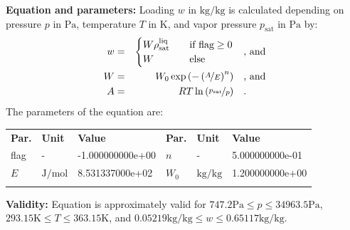 \textbf{Equation and parameters:}
\newline
%
Loading $w$ in $\si{\kilogram\per\kilogram}$ is calculated depending on pressure $p$ in $\si{\pascal}$, temperature $T$ in $\si{\kelvin}$, and vapor pressure $p_\mathrm{sat}$ in $\si{\pascal}$ by:
%
\begin{equation*}
\begin{split}
w &=& \begin{cases} W \rho_\mathrm{sat}^{\mathrm{liq}} & \quad \text{if flag} \geq 0 \\ W & \quad \text{else} \end{cases} & \quad\text{, and} \\
W &=& W_0 \exp \left( - \left( \nicefrac{A}{E} \right) ^{n} \right) & \quad\text{, and} \\
A &=& R T \ln \left( \nicefrac{p_\mathrm{sat}}{p} \right) & \quad\text{.} \\
\end{split}
\end{equation*}
%
The parameters of the equation are:
%
\begin{longtable}[l]{lll|lll}
\toprule
\addlinespace
\textbf{Par.} & \textbf{Unit} & \textbf{Value} &	\textbf{Par.} & \textbf{Unit} & \textbf{Value} \\
\addlinespace
\midrule
\endhead

\bottomrule
\endfoot
\bottomrule
\endlastfoot
\addlinespace

flag & - & -1.000000000e+00 & $n$ & - & 5.000000000e-01 \\
$E$ & $\si{\joule\per\mole}$ & 8.531337000e+02 & $W_0$ & $\si{\kilogram\per\kilogram}$ & 1.200000000e+00 \\

\addlinespace\end{longtable}

\textbf{Validity:}
\newline
Equation is approximately valid for $747.2 \si{\pascal} \leq p \leq 34963.5 \si{\pascal}$,  $293.15 \si{\kelvin} \leq T \leq 363.15 \si{\kelvin}$, and $0.05219 \si{\kilogram\per\kilogram} \leq w \leq 0.65117 \si{\kilogram\per\kilogram}$.
\newline

